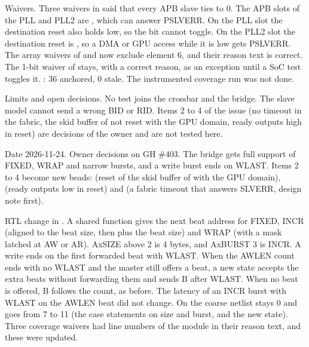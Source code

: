 \begin{record}

Waivers. Three waivers in  said that every APB slave ties  to 0. The APB slots of the PLL and PLL2 are , which can answer PSLVERR. On the PLL slot the destination reset also holds  low, so the bit cannot toggle. On the PLL2 slot the destination reset is , so a DMA or GPU access while it is low gets PSLVERR. The array waivers of  and  now exclude element 6, and their reason text is correct. The 1-bit waiver of   stays, with a correct reason, as an exception until a SoC test toggles it. : 36 anchored, 0 stale. The instrumented coverage run was not done.

\end{record}

\begin{record}

Limits and open decisions. No test joins the crossbar and the bridge. The slave model cannot send a wrong BID or RID. Items 2 to 4 of the issue (no timeout in the fabric, the skid buffer of  not reset with the GPU domain, ready outputs high in reset) are decisions of the owner and are not tested here.

\end{record}

\begin{record}

Date 2026-11-24. Owner decisions on GH \#403. The bridge  gets full support of FIXED, WRAP and narrow bursts, and a write burst ends on WLAST. Items 2 to 4 become new beads:  (reset of the skid buffer of  with the GPU domain),  (ready outputs low in reset) and  (a fabric timeout that answers SLVERR, design note first).

\end{record}

\begin{record}

RTL change in . A shared function  gives the next beat address for FIXED, INCR (aligned to the beat size, then plus the beat size) and WRAP (with a mask latched at AW or AR). AxSIZE above 2 is 4 bytes, and AxBURST 3 is INCR. A write ends on the first forwarded beat with WLAST. When the AWLEN count ends with no WLAST and the master still offers a beat, a new state  accepts the extra beats without forwarding them and sends B after WLAST. When no beat is offered, B follows the count, as before. The latency of an INCR burst with WLAST on the AWLEN beat did not change. On the coarse netlist  stays 0 and  goes from 7 to 11 (the case statements on size and burst, and the new state). Three coverage waivers had line numbers of the module in their reason text, and these were updated.

\end{record}

